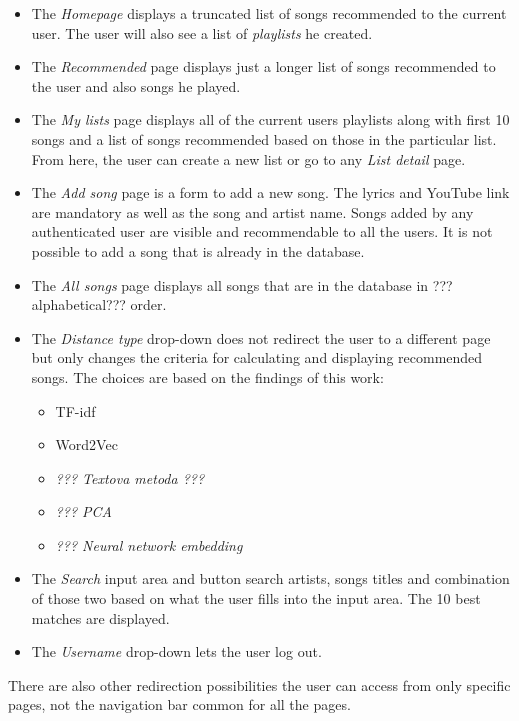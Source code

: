 \begin{itemize}
    \item The \textit{Homepage} displays a truncated list of songs recommended to the current user. The user will also see a list of \textit{playlists} he created.
    \item The \textit{Recommended} page displays just a longer list of songs recommended to the user and also songs he played.
    \item The \textit{My lists} page displays all of the current users playlists along with first 10 songs and a list of songs recommended based on those in the particular list. From here, the user can create a new list or go to any \textit{List detail} page.
    \item The \textit{Add song} page is a form to add a new song. The lyrics and YouTube link are mandatory as well as the song and artist name. Songs added by any authenticated user are visible and recommendable to all the users. It is not possible to add a song that is already in the database.
    \item The \textit{All songs} page displays all songs that are in the database in ???alphabetical??? order.
    \item The \textit{Distance type} drop-down does not redirect the user to a different page but only changes the criteria for calculating and displaying recommended songs. The choices are based on the findings of this work: \begin{itemize}
        \item TF-idf
        \item Word2Vec
        \item \textit{??? Textova metoda ???}
        \item \textit{??? PCA}
        \item \textit{??? Neural network embedding}
    \end{itemize}
    \item The \textit{Search} input area and button search artists, songs titles and combination of those two based on what the user fills into the input area. The 10 best matches are displayed.
    \item The \textit{Username} drop-down lets the user log out.
\end{itemize}
There are also other redirection possibilities the user can access from only specific pages, not the navigation bar common for all the pages.
